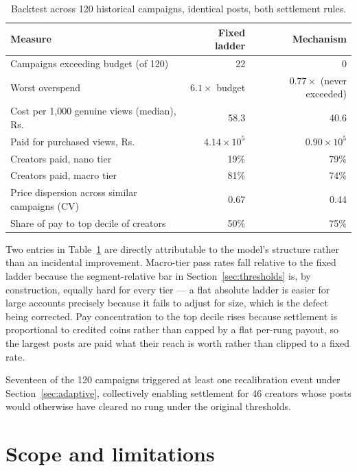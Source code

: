 \documentclass[11pt]{article}
\begin{document}
\begin{table}[h]
\centering
\begin{tabular}{@{}lrr@{}}
\toprule
Measure & Fixed ladder & Mechanism \\
\midrule
Campaigns exceeding budget (of 120) & 22 & 0 \\
Worst overspend & $6.1\times$ budget & $0.77\times$ (never exceeded) \\
Cost per 1{,}000 genuine views (median), Rs. & 58.3 & 40.6 \\
Paid for purchased views, Rs. & $4.14\times 10^5$ & $0.90\times 10^5$ \\
Creators paid, nano tier & 19\% & 79\% \\
Creators paid, macro tier & 81\% & 74\% \\
Price dispersion across similar campaigns (CV) & 0.67 & 0.44 \\
Share of pay to top decile of creators & 50\% & 75\% \\
\bottomrule
\end{tabular}
\caption{Backtest across 120 historical campaigns, identical posts, both settlement rules.}
\label{tab:backtest}
\end{table}

Two entries in Table~\ref{tab:backtest} are directly attributable to the model's structure rather
than an incidental improvement. Macro-tier pass rates fall relative to the fixed ladder because
the segment-relative bar in Section~\ref{sec:thresholds} is, by construction, equally hard for
every tier — a flat absolute ladder is easier for large accounts precisely because it fails to
adjust for size, which is the defect being corrected. Pay concentration to the top decile rises
because settlement is proportional to credited coins rather than capped by a flat per-rung payout,
so the largest posts are paid what their reach is worth rather than clipped to a fixed rate.

Seventeen of the 120 campaigns triggered at least one recalibration event under
Section~\ref{sec:adaptive}, collectively enabling settlement for 46 creators whose posts would
otherwise have cleared no rung under the original thresholds.

\section{Scope and limitations}
\label{sec:scope}
\end{document}
